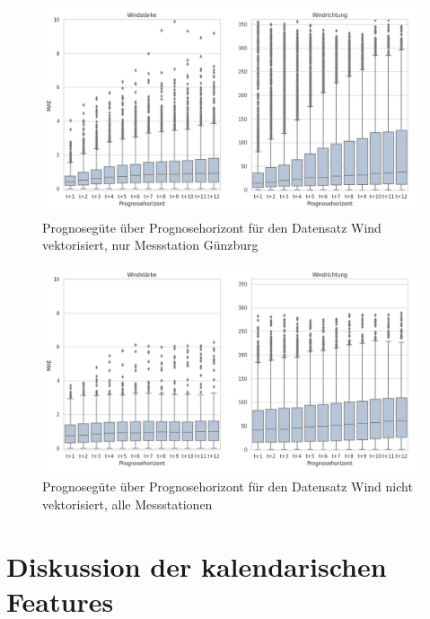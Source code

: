\documentclass[
12pt, %
toc=listofnumbered, %
toc=chapterentrydotfill, %
numbers=noenddot, %
captions=tableheading, %
bibliography=numbered
]{scrreprt}
\let\Oldsection\section
\renewcommand{\section}{\FloatBarrier\Oldsection}
\newcommand{\qm}[1]{\glqq#1\grqq{}} %
\begin{document}
\begin{figure}[tph]
	\begin{center}
		\includegraphics[width=\linewidth]{./images/Güte über Prognosehorizont sd single-cropped.jpg}
		\caption{Prognosegüte über Prognosehorizont für den Datensatz \qm{Wind vektorisiert, nur Messstation Günzburg}}
		\label{fig:güte_über_zeit_xy_single}
	\end{center}
\end{figure}

\begin{figure}[tph]
	\begin{center}
		\includegraphics[width=\linewidth]{./images/Güte über Prognosehorizont sd direkt-cropped.jpg}
		\caption{Prognosegüte über Prognosehorizont für den Datensatz \qm{Wind nicht vektorisiert, alle Messstationen}}
		\label{fig:güte_über_zeit_sd_all}
	\end{center}
\end{figure}

\section{Diskussion der kalendarischen Features}
\end{document}
